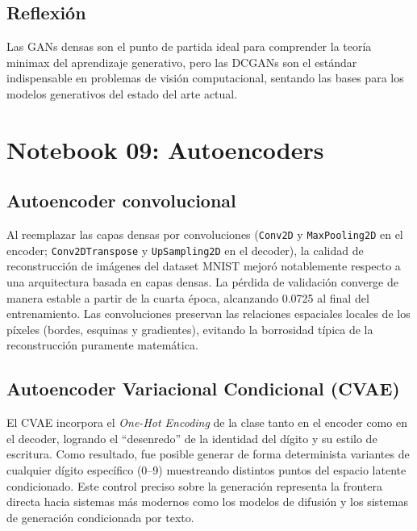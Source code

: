 \documentclass[12pt, a4paper]{article}
\begin{document}
\subsection{Reflexión}

Las GANs densas son el punto de partida ideal para comprender la teoría minimax del aprendizaje generativo, pero las DCGANs son el estándar indispensable en problemas de visión computacional, sentando las bases para los modelos generativos del estado del arte actual.

\section{Notebook 09: Autoencoders}

\subsection{Autoencoder convolucional}

Al reemplazar las capas densas por convoluciones (\texttt{Conv2D} y \texttt{MaxPooling2D} en el encoder; \texttt{Conv2DTranspose} y \texttt{UpSampling2D} en el decoder), la calidad de reconstrucción de imágenes del dataset MNIST mejoró notablemente respecto a una arquitectura basada en capas densas. La pérdida de validación converge de manera estable a partir de la cuarta época, alcanzando 0.0725 al final del entrenamiento. Las convoluciones preservan las relaciones espaciales locales de los píxeles (bordes, esquinas y gradientes), evitando la borrosidad típica de la reconstrucción puramente matemática.

\newpage
\subsection{Autoencoder Variacional Condicional (CVAE)}

El CVAE incorpora el \textit{One-Hot Encoding} de la clase tanto en el encoder como en el decoder, logrando el ``desenredo'' de la identidad del dígito y su estilo de escritura. Como resultado, fue posible generar de forma determinista variantes de cualquier dígito específico (0--9) muestreando distintos puntos del espacio latente condicionado. Este control preciso sobre la generación representa la frontera directa hacia sistemas más modernos como los modelos de difusión y los sistemas de generación condicionada por texto.
\end{document}
